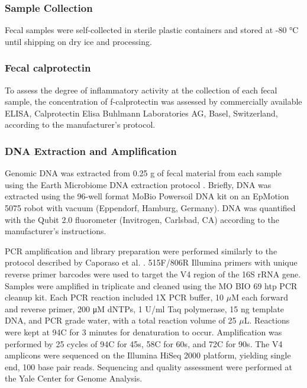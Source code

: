 \subsubsection{Sample Collection}

Fecal samples were self-collected in sterile plastic containers and stored at -80 °C until shipping on dry ice and processing.

\subsubsection{Fecal calprotectin} 

To assess the degree of inflammatory activity at the collection of each fecal sample, the concentration of f-calprotectin was assessed by commercially available ELISA, Calprotectin Elisa Buhlmann Laboratories AG, Basel, Switzerland, according to the manufacturer's protocol. 

\subsubsection{DNA Extraction and Amplification}

Genomic DNA was extracted from 0.25 g of fecal material from each sample using the Earth Microbiome DNA extraction protocol \cite{EMP2011}. Briefly, DNA was extracted using the 96-well format MoBio Powersoil DNA kit on an EpMotion 5075 robot with vacuum (Eppendorf, Hamburg, Germany). DNA was quantified with the Qubit 2.0 fluorometer (Invitrogen, Carlsbad, CA) according to the manufacturer's instructions.

PCR amplification and library preparation were performed similarly to the protocol described by Caporaso et al. \cite{Caporaso2011proceedings}. 515F/806R Illumina primers with unique reverse primer barcodes were used to target the V4 region of the 16S rRNA gene. Samples were amplified in triplicate and cleaned using the MO BIO 69 htp PCR cleanup kit. Each PCR reaction included 1X PCR buffer, 10 $\mu$M each forward and reverse primer, 200 μM dNTPs, 1 U/ml Taq polymerase, 15 ng template DNA, and PCR grade water, with a total reaction volume of 25 $\mu$L. Reactions were kept at 94\textdegree C for 3 minutes for denaturation to occur. Amplification was performed by 25 cycles of 94\textdegree C for 45s, 58\textdegree C for 60s, and 72\textdegree C for 90s. The V4 amplicons were sequenced on the Illumina HiSeq 2000 platform, yielding single end, 100 base pair reads. Sequencing and quality assessment were performed at the Yale Center for Genome Analysis.

